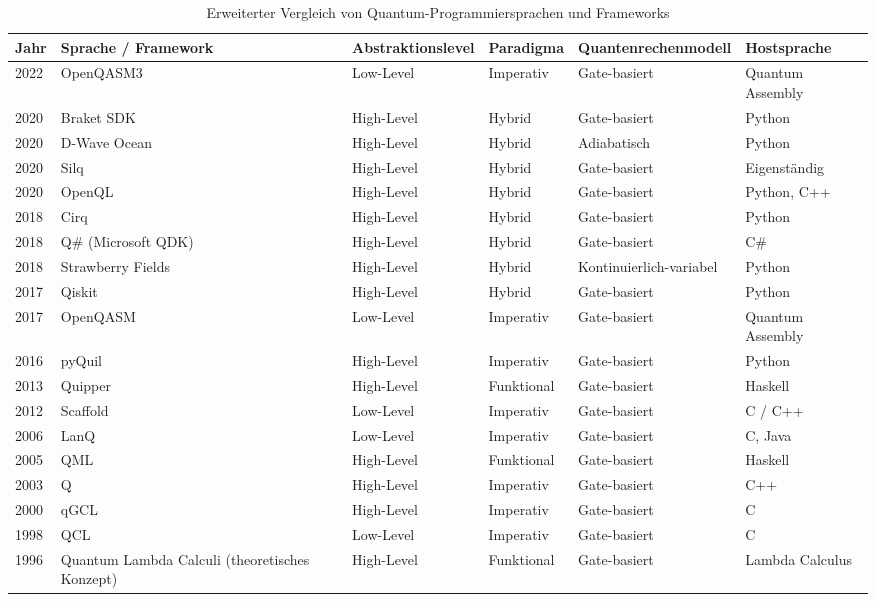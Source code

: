 \begin{table}[H]
\centering
\footnotesize
\begin{tabularx}{\textwidth}{|l|p{2cm}|l|l|l|X|}
\hline
\textbf{Jahr} & 
\textbf{Sprache / Framework} & 
\textbf{Abstraktionslevel} & 
\textbf{Paradigma} & 
\textbf{Quantenrechenmodell} & 
\textbf{Hostsprache} \\
\hline
2022 & OpenQASM3 & Low-Level & Imperativ & Gate-basiert & Quantum Assembly \\
\hline
2020 & Braket SDK & High-Level & Hybrid & Gate-basiert & Python \\
\hline
2020 & D-Wave Ocean & High-Level & Hybrid & Adiabatisch & Python \\
\hline
2020 & Silq & High-Level & Hybrid & Gate-basiert & Eigenständig \\
\hline
2020 & OpenQL & High-Level & Hybrid & Gate-basiert & Python, C++ \\
\hline
2018 & Cirq & High-Level & Hybrid & Gate-basiert & Python \\
\hline
2018 & Q\# (Microsoft QDK) & High-Level & Hybrid & Gate-basiert & C\# \\
\hline
2018 & Strawberry Fields & High-Level & Hybrid & Kontinuierlich-variabel & Python \\
\hline
2017 & Qiskit & High-Level & Hybrid & Gate-basiert & Python \\
\hline
2017 & OpenQASM & Low-Level & Imperativ &  Gate-basiert & Quantum Assembly \\
\hline
2016 & pyQuil & High-Level & Imperativ &  Gate-basiert & Python \\
\hline
2013 & Quipper & High-Level & Funktional & Gate-basiert & Haskell \\
\hline
2012 & Scaffold & Low-Level & Imperativ &  Gate-basiert & C / C++ \\
\hline
2006 & LanQ & Low-Level & Imperativ & Gate-basiert & C, Java \\
\hline
2005 & QML & High-Level & Funktional & Gate-basiert & Haskell \\
\hline
2003 & Q & High-Level & Imperativ & Gate-basiert & C++ \\
\hline
2000 & qGCL & High-Level & Imperativ &  Gate-basiert & C \\
\hline
1998 & QCL & Low-Level & Imperativ & Gate-basiert & C \\
\hline
1996 & Quantum Lambda Calculi (theoretisches Konzept) & High-Level & Funktional & Gate-basiert & Lambda Calculus \\
\hline
\end{tabularx}
\caption{Erweiterter Vergleich von Quantum-Programmiersprachen und Frameworks}
\label{tab:quantum_languages_full}
\end{table}

